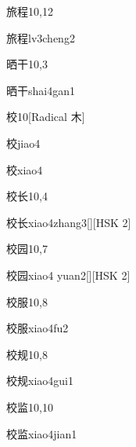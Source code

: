 \begin{entry}{旅程}{10,12}
  \begin{phonetics}{旅程}{lv3cheng2}
  \end{phonetics}
\end{entry}

\begin{entry}{晒干}{10,3}
  \begin{phonetics}{晒干}{shai4gan1}
  \end{phonetics}
\end{entry}

\begin{entry}{校}{10}[Radical 木]
  \begin{phonetics}{校}{jiao4}
  \end{phonetics}
  \begin{phonetics}{校}{xiao4}
  \end{phonetics}
\end{entry}

\begin{entry}{校长}{10,4}
  \begin{phonetics}{校长}{xiao4zhang3}[][HSK 2]
  \end{phonetics}
\end{entry}

\begin{entry}{校园}{10,7}
  \begin{phonetics}{校园}{xiao4 yuan2}[][HSK 2]
  \end{phonetics}
\end{entry}

\begin{entry}{校服}{10,8}
  \begin{phonetics}{校服}{xiao4fu2}
  \end{phonetics}
\end{entry}

\begin{entry}{校规}{10,8}
  \begin{phonetics}{校规}{xiao4gui1}
  \end{phonetics}
\end{entry}

\begin{entry}{校监}{10,10}
  \begin{phonetics}{校监}{xiao4jian1}
  \end{phonetics}
\end{entry}

